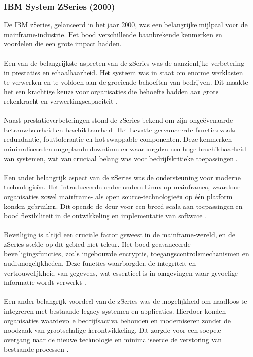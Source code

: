 \subsubsection{IBM System ZSeries (2000)}
De IBM zSeries, gelanceerd in het jaar 2000, was een belangrijke mijlpaal voor de mainframe-industrie. Het bood verschillende baanbrekende kenmerken en voordelen die een grote impact hadden.
\\ \\
Een van de belangrijkste aspecten van de zSeries was de aanzienlijke verbetering in prestaties en schaalbaarheid. Het systeem was in staat om enorme werklasten te verwerken en te voldoen aan de groeiende behoeften van bedrijven. Dit maakte het een krachtige keuze voor organisaties die behoefte hadden aan grote rekenkracht en verwerkingscapaciteit \autocite{IBM2024d}.
\\ \\
Naast prestatieverbeteringen stond de zSeries bekend om zijn ongeëvenaarde betrouwbaarheid en beschikbaarheid. Het bevatte geavanceerde functies zoals redundantie, fouttolerantie en hot-swappable componenten. Deze kenmerken minimaliseerden ongeplande downtime en waarborgden een hoge beschikbaarheid van systemen, wat van cruciaal belang was voor bedrijfskritieke toepassingen \autocite{IBM2024d}.
\\ \\
Een ander belangrijk aspect van de zSeries was de ondersteuning voor moderne technologieën. Het introduceerde onder andere Linux op mainframes, waardoor organisaties zowel mainframe- als open source-technologieën op één platform konden gebruiken. Dit opende de deur voor een breed scala aan toepassingen en bood flexibiliteit in de ontwikkeling en implementatie van software \autocite{IBM2024d}.
\\ \\
Beveiliging is altijd een cruciale factor geweest in de mainframe-wereld, en de zSeries stelde op dit gebied niet teleur. Het bood geavanceerde beveiligingsfuncties, zoals ingebouwde encryptie, toegangscontrolemechanismen en auditmogelijkheden. Deze functies waarborgden de integriteit en vertrouwelijkheid van gegevens, wat essentieel is in omgevingen waar gevoelige informatie wordt verwerkt \autocite{IBM2024d}.
\\ \\
Een ander belangrijk voordeel van de zSeries was de mogelijkheid om naadloos te integreren met bestaande legacy-systemen en applicaties. Hierdoor konden organisaties waardevolle bedrijfsactiva behouden en moderniseren zonder de noodzaak van grootschalige herontwikkeling. Dit zorgde voor een soepele overgang naar de nieuwe technologie en minimaliseerde de verstoring van bestaande processen \autocite{IBM2024d}.
\\ \\
